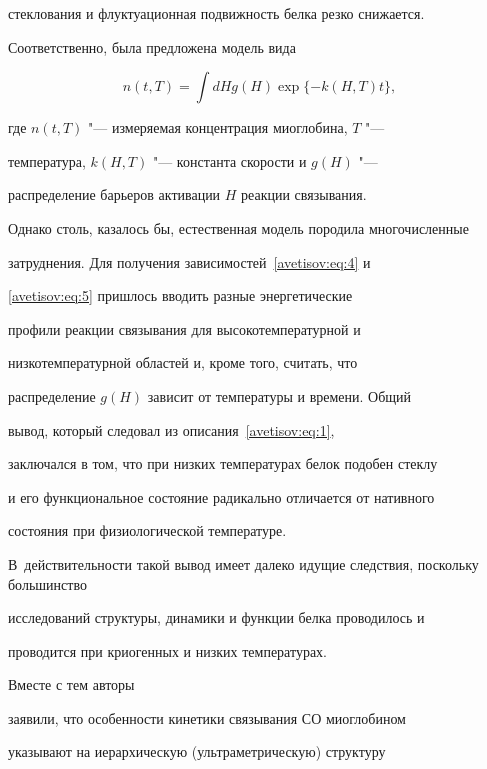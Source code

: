 стеклования и флуктуационная подвижность белка резко снижается.

Соответственно, была предложена модель вида

\begin{equation}

n(t,T)=\int d Hg(H)\exp{\{-k(H,T)t\}},

\label{avetisov:eq:1}

\end{equation}

где $n(t,T)$ "--- измеряемая концентрация миоглобина, $T$ "---

температура, \linebreak $k(H,T)$ "---  константа скорости и $g(H)$ "---

распределение барьеров активации  $H$  реакции связывания. 

Однако столь, казалось бы, естественная модель породила многочисленные

затруднения. Для получения зависимостей~\eqref{avetisov:eq:4} и

\eqref{avetisov:eq:5} пришлось вводить разные энергетические

профили реакции связывания для высокотемпературной  и

низкотемпературной областей  и, кроме того, считать, что

распределение  $g(H)$ зависит от температуры и времени. Общий

вывод, который  следовал из описания~\eqref{avetisov:eq:1},

заключался в том, что при низких температурах белок подобен стеклу

и его функциональное состояние радикально отличается от нативного

состояния при  физиологической температуре. 

В~действительности такой вывод имеет далеко идущие следствия, поскольку большинство

исследований структуры, динамики и функции белка проводилось и

проводится при криогенных и низких температурах.



Вместе с тем  авторы \cite{avetisov_bikulov_zubarev:bib:Ansary,avetisov_bikulov_zubarev:bib:Steinbach}

заявили, что особенности кинетики  связывания СО миоглобином

указывают на  иерархическую (ультраметрическую) структуру

